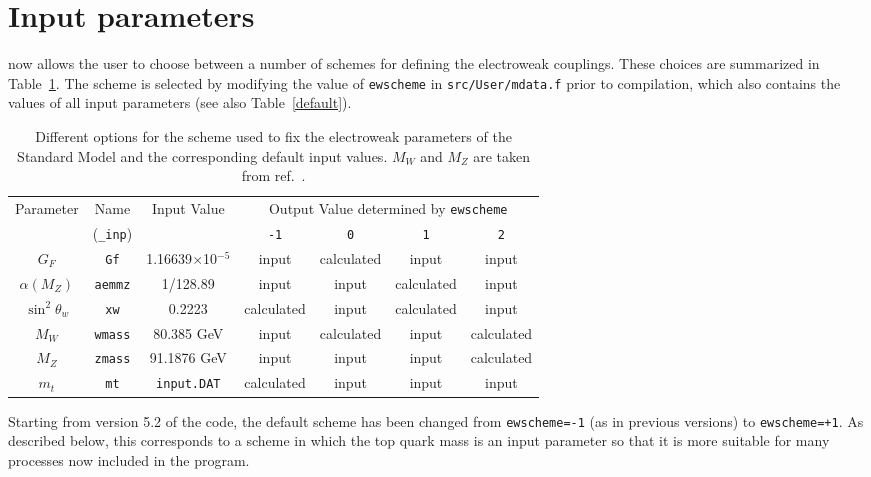 \documentclass[12pt]{article}
\begin{document}
\section{Input parameters}
\label{Input_parameters}
\MCFM now allows the user to choose between a number of schemes
for defining the electroweak couplings. These choices are summarized
in Table~\ref{ewscheme}. The scheme is selected by modifying the
value of {\tt ewscheme} in {\tt src/User/mdata.f} prior to compilation, 
which also contains
the values of all input parameters (see also Table~\ref{default}).

\begin{table}
\begin{center}
\begin{tabular}{|c|c|c|c|c|c|c|} \hline
 Parameter & Name & Input Value
 & \multicolumn{4}{c|}{Output Value determined by \tt ewscheme} \\
\cline{4-7}
& ({\tt \_inp}) & & {\tt -1} & {\tt 0} & {\tt 1} & {\tt 2} \\ \hline
$G_F$            & {\tt Gf}      & 1.16639$\times$10$^{-5}$ 
 & input & calculated & input & input \\
$\alpha(M_Z)$    & {\tt aemmz}   & 1/128.89                 
 & input & input & calculated & input \\
$\sin^2 \theta_w$& {\tt xw}      & 0.2223               
 & calculated & input & calculated & input \\
$M_W$            & {\tt wmass}   & 80.385 GeV                
 & input & calculated & input & calculated \\
$M_Z$            & {\tt zmass}   & 91.1876 GeV               
 & input & input & input & calculated \\
$m_t$            & {\tt mt}      & {\tt input.DAT}                  
 & calculated & input & input & input \\
\hline
\end{tabular}
\caption{Different options for the scheme used to fix the electroweak
parameters of the Standard Model and the corresponding default input
values. $M_W$ and $M_Z$ are taken from ref.~\cite{Amsler:2008zzb}.}
\label{ewscheme}
\end{center}
\end{table}

Starting from version 5.2 of the code, the default scheme has been
changed from {\tt ewscheme=-1} (as in previous versions) to
{\tt ewscheme=+1}. As described below, this corresponds to a scheme
in which the top quark mass is an input parameter so that it is
more suitable for many processes now included in the program.
\end{document}
